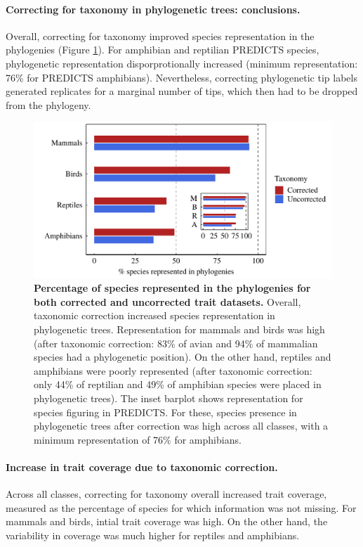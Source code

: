 \paragraph{Correcting for taxonomy in phylogenetic trees: conclusions.}
Overall, correcting for taxonomy improved species representation in the phylogenies (Figure \ref{species_rep_phylo}). For amphibian and reptilian PREDICTS species, phylogenetic representation disporprotionally increased (minimum representation: 76\% for PREDICTS amphibians). Nevertheless, correcting phylogenetic tip labels generated replicates
 for a marginal number of tips, which then had to be dropped from the phylogeny. 

\begin{figure}[h!]
\centering
\includegraphics[scale=0.7]{figures/chapter2/Species_representation_phylo}
\caption[Percentage of species represented in the phylogenies for both corrected and uncorrected trait datasets]{\textbf{Percentage of species represented in the phylogenies for both corrected and uncorrected trait datasets.} Overall, taxonomic correction increased species representation in phylogenetic trees. Representation for mammals and birds was high (after taxonomic correction: 83\% of avian and 94\% of mammalian species had a phylogenetic position). On the other hand, reptiles and amphibians were poorly represented (after taxonomic correction: only 44\% of reptilian and 49\% of amphibian species were placed in phylogenetic trees). The inset barplot shows representation for species figuring in PREDICTS. For these, species presence in phylogenetic trees after correction was high across all classes, with a minimum representation of 76\% for amphibians.}
\label{species_rep_phylo}
\end{figure}

\paragraph{Increase in trait coverage due to taxonomic correction.}
Across all classes, correcting for taxonomy overall increased trait coverage, measured as the percentage of species for which information was not missing. For mammals and birds, intial trait coverage was high. On the other hand, the variability in coverage was much higher for reptiles and amphibians.

